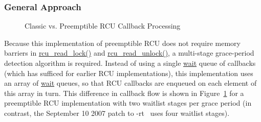 \subsubsection{General Approach}
\label{app:rcuimpl:General Approach}

\begin{figure}[htb]
\begin{center}
\end{center}
\caption{Classic vs. Preemptible RCU Callback Processing}
\label{app:rcuimpl:Classic vs. Preemptible RCU Callback Processing}
\end{figure}

Because this implementation of preemptible RCU does not require memory
barriers in \url{rcu_read_lock()} and \url{rcu_read_unlock()},
a multi-stage grace-period detection algorithm is required.
Instead of using a single \url{wait} queue of callbacks
(which has sufficed for earlier RCU implementations), this implementation
uses an array of \url{wait} queues, so that RCU callbacks
are enqueued on each element of this array in turn.
This difference in callback flow is shown in
Figure~\ref{app:rcuimpl:Classic vs. Preemptible RCU Callback Processing}
for a preemptible RCU implementation with two waitlist stages per grace period
(in contrast,
the September 10 2007 patch to -rt~\cite{PaulEMcKenney2007PreemptibleRCUPatch}
uses four waitlist stages).

